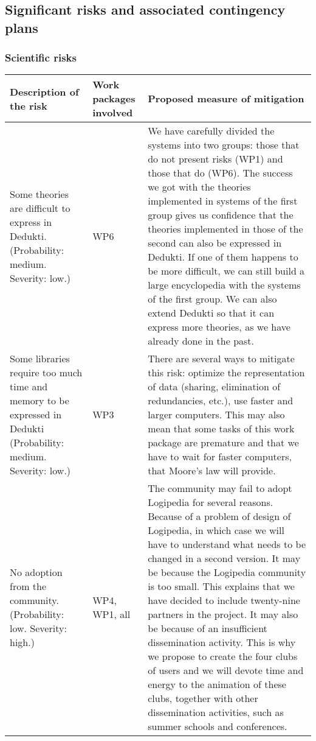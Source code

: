 \subsection{Significant risks and associated contingency plans}\label{sec:risks}

\subsubsection*{Scientific risks}

\begin{longtable}{|p{}|p{}|p{}|}
\hline
{\bf Description of the risk}
&
{\bf Work packages involved}
&
{\bf Proposed measure of mitigation}
\\
\hline
Some theories are difficult to express in Dedukti.
(Probability: medium. Severity: low.)
&
WP6
&
We have carefully divided the systems into two groups: those that do not
present risks (WP1) and those that do (WP6). The success we got with the
theories implemented in systems of the first group gives us confidence
that the theories implemented in those of the second can also be
expressed in Dedukti.  If one of them happens to be more difficult, we
can still build a large encyclopedia with the systems of the first
group. We can also extend Dedukti so that it can express more theories,
as we have already done in the past.
\\
\hline
Some libraries require too much time and memory
to be expressed in Dedukti (Probability: medium. Severity: low.)
&
WP3
&
There are several ways to mitigate this risk: optimize the
representation of data (sharing, elimination of redundancies, etc.), 
use faster and larger computers. This may also mean that some tasks
of this work package are premature and that we have to wait for
faster computers, that Moore's law will provide.
\\
\hline
No adoption from the community. (Probability: low. Severity: high.)
&
WP4, WP1, all 
&
The community may fail to adopt Logipedia for several reasons. Because
of a problem of design of Logipedia, in which case we will have to
understand what needs to be changed in a second version.  It may be
because the Logipedia community is too small.  This explains that we
have decided to include twenty-nine partners in the project.  It may
also be because of an insufficient dissemination activity.  This is
why we propose to create the four clubs of users and we will devote
time and energy to the animation of these clubs, together with other
dissemination activities, such as summer schools and conferences.
\\
\hline
\end{longtable}

